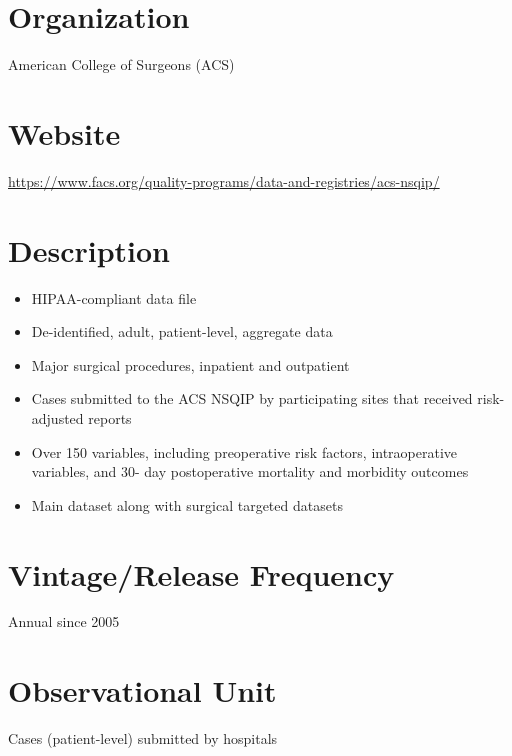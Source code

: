 \documentclass[
]{book}
\providecommand{\tightlist}{%
  \setlength{\itemsep}{0pt}\setlength{\parskip}{0pt}}
\begin{document}
\hypertarget{organization-2}{%
\section{Organization}\label{organization-2}}

American College of Surgeons (ACS)

\hypertarget{website-2}{%
\section{Website}\label{website-2}}

\url{https://www.facs.org/quality-programs/data-and-registries/acs-nsqip/}

\hypertarget{description-2}{%
\section{Description}\label{description-2}}

\begin{itemize}
\tightlist
\item
  HIPAA-compliant data file
\item
  De-identified, adult, patient-level, aggregate data
\item
  Major surgical procedures, inpatient and outpatient
\item
  Cases submitted to the ACS NSQIP by participating sites that received risk-adjusted reports
\item
  Over 150 variables, including preoperative risk factors, intraoperative variables, and 30- day postoperative mortality and morbidity outcomes
\item
  Main dataset along with surgical targeted datasets
\end{itemize}

\hypertarget{vintagerelease-frequency-2}{%
\section{Vintage/Release Frequency}\label{vintagerelease-frequency-2}}

Annual since 2005

\hypertarget{observational-unit-2}{%
\section{Observational Unit}\label{observational-unit-2}}

Cases (patient-level) submitted by hospitals
\end{document}
